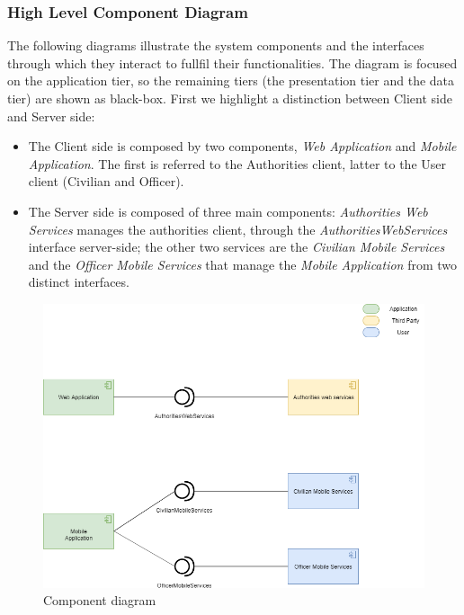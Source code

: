 \documentclass[12pt,a4paper]{article}
\begin{document}
\subsubsection{High Level Component Diagram}
The following diagrams illustrate the system components and the interfaces through which they interact to fullfil their functionalities. The diagram is focused on the application tier, so the remaining tiers (the presentation tier and the data tier) are shown as black-box.
First we highlight a distinction between Client side and Server side:
\begin{itemize}
\item The Client side is composed by two components, \textit{Web Application} and \textit{Mobile Application}. The first is referred to the Authorities client, latter to the User client (Civilian and Officer).
\item The Server side is composed of three main components: \textit{Authorities Web Services} manages the authorities client, through the \textit{AuthoritiesWebServices} interface server-side; the other two services are the \textit{Civilian Mobile Services} and the \textit{Officer Mobile Services} that manage  the \textit{Mobile Application} from two distinct interfaces.
\end{itemize}
\begin{figure}[H]
		\centering
			\includegraphics[width=1.0\linewidth]{Images/ComponentDiagram}
		\caption{Component diagram}
\end{figure}
\end{document}
